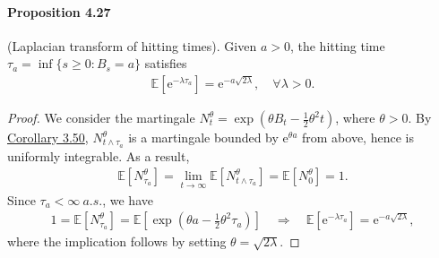 \documentclass{article}
\numberwithin{equation}{section}
\newcommand{\e}{\mathrm{e}}
\newcommand{\E}{\mathbb{E}}
\theoremstyle{plain}
\theoremstyle{definition}
\begin{document}
\paragraph{Proposition 4.27\label{prop:4.27}} (Laplacian transform of hitting times). Given $a>0$, the hitting time $\tau_a=\inf\{s\geq 0:B_s=a\}$ satisfies
\begin{align*}
	\E\left[\e^{-\lambda\tau_a}\right]=\e^{-a\sqrt{2\lambda}},\quad\forall\lambda>0.
\end{align*}
\begin{proof}
We consider the martingale $N_t^\theta=\exp(\theta B_t-\frac{1}{2}\theta^2t)$, where $\theta>0$. By \hyperref[cor:3.50]{Corollary 3.50}, $N_{t\wedge\tau_a}^\theta$ is a martingale bounded by $\e^{\theta a}$ from above, hence is uniformly integrable. As a result,
\begin{align*}
	\E\left[N_{\tau_a}^\theta\right]=\lim_{t\to\infty}\E\left[N_{t\wedge\tau_a}^\theta\right] = \E[N_0^\theta] = 1.
\end{align*}
Since $\tau_a<\infty\ a.s.$, we have
\begin{align*}
	1=\E\left[N_{\tau_a}^\theta\right] = \E\left[\exp\left(\theta a-\frac{1}{2}\theta^2\tau_a\right)\right]\quad\Rightarrow\quad \E\left[\e^{-\lambda\tau_a}\right]=\e^{-a\sqrt{2\lambda}},
\end{align*}
where the implication follows by setting $\theta=\sqrt{2\lambda}$.
\end{proof}
\end{document}
